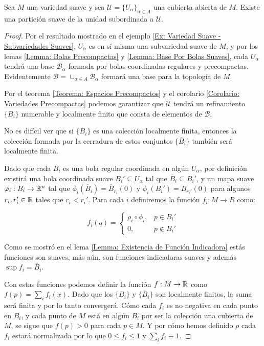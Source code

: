 \begin{theorem}\label{Teorema: Existencia de Particiones Suave de la Unidad}
	Sea $M$ una variedad suave y sea $\mathcal{U} = \{U_\alpha\}_{\alpha \in A}$ una cubierta abierta de $M$. Existe una partición suave de la unidad subordinada a $\mathcal{U}$.
\end{theorem}

\begin{proof}
	Por el resultado mostrado en el ejemplo \ref{Ex: Variedad Suave - Subvariedades Suaves}, $U_\alpha$ es en sí misma una subvariedad suave de $M$, y por los lemas \ref{Lemma: Bolas Precompactas} y \ref{Lemma: Base Por Bolas Suaves}, cada $U_\alpha$ tendrá una base $\mathcal{B}_\alpha$ formada por bolas coordinadas regulares y precompactas. Evidentemente $\mathcal{B} = \cup_{\alpha \in A} \mathcal{B}_\alpha$ formará una base para la topología de $M$.

	Por el teorema \ref{Teorema: Espacios Precompactos} y el corolario \ref{Corolario: Variedades Precompactas} podemos garantizar que $\mathcal{U}$ tendrá un refinamiento $\{B_i\}$ numerable y localmente finito que consta de elementos de $\mathcal{B}$.

	No es difícil ver que si $\{B_i\}$ es una colección localmente finita, entonces la colección formada por la cerradura de estos conjuntos $\{\overline{B}_i\}$ también será localmente finita.


	Dado que cada $B_i$ es una bola regular coordinada en algún $U_\alpha$, por definición existirá una bola coordinada suave $B_i' \subseteq U_\alpha$ tal que $\overline{B}_{i} \subseteq B_i'$, y un mapa suave $\varphi_i: B_i \to \mathbb{R}^n$ tal que $\phi_i(\overline{B}_i) = \overline{B}_{r_i}(0)$ y $\phi_i(B_i') = B_{r_i'}(0)$ para algunos $r_i, r_i' \in \mathbb{R}$ tales que $r_i < r_i'$. Para cada $i$ definiremos la función $f_i: M \to R$ como:

	\[
		f_i(q)= \begin{cases}
			\rho_i \circ \phi_i, & p \in B_i'    \\
			0,                   & p \notin B_i'
		\end{cases}
	\]

	Como se mostró en el lema \ref{Lemma: Existencia de Función Indicadora} estás funciones son suaves, más aún, son funciones indicadoras suaves y además $\sup f_i = \overline{B}_i$.

	Con estas funciones podemos definir la función $f: M \to \mathbb{R}$ como $f(p) = \sum_i f_i(x)$. Dado que los $\{B_i\}$ y $\{\overline{B}_i\}$ son localmente finitos, la suma será finita y por lo tanto convergerá. Cómo cada $f_i$ es no negativa en cada punto en $B_i$, y cada punto de $M$ está en algún $B_i$ por ser la colección una cubierta de $M$, se sigue que $f(p) > 0$ para cada $p \in M$. Y por cómo hemos definido $\rho$ cada $f_i$ estará normalizada por lo que $0 \leq f_i \leq 1$ y $\sum_i f_i \equiv 1$.


\end{proof}
